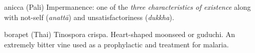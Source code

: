 \begin{glossarydescription}

\item[anicca] (Pali) Impermanence: one of the \emph{three characteristics of
    existence} along with not-self (\emph{anattā}) and unsatisfactoriness
  (\emph{dukkha}).


\item[borapet] (Thai) Tinospora crispa. Heart-shaped moonseed or guduchi.
  An extremely bitter vine used as a prophylactic and treatment for malaria.






















\end{glossarydescription}


